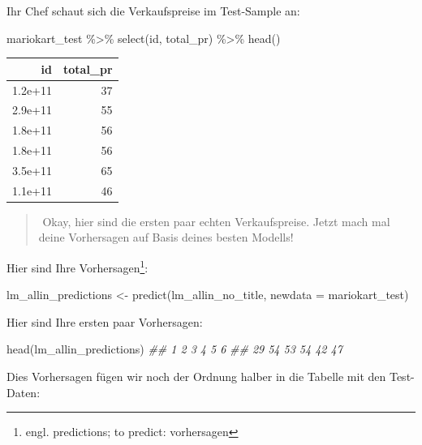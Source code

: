 \documentclass[
  letterpaper,
]{scrbook}
\newenvironment{Shaded}{\begin{snugshade}}{\end{snugshade}}
\newcommand{\AttributeTok}[1]{\textcolor[rgb]{0.40,0.45,0.13}{#1}}
\newcommand{\DocumentationTok}[1]{\textcolor[rgb]{0.37,0.37,0.37}{\textit{#1}}}
\newcommand{\FunctionTok}[1]{\textcolor[rgb]{0.28,0.35,0.67}{#1}}
\newcommand{\NormalTok}[1]{\textcolor[rgb]{0.00,0.23,0.31}{#1}}
\newcommand{\OtherTok}[1]{\textcolor[rgb]{0.00,0.23,0.31}{#1}}
\newcommand{\SpecialCharTok}[1]{\textcolor[rgb]{0.37,0.37,0.37}{#1}}
\theoremstyle{definition}
\theoremstyle{definition}
\theoremstyle{definition}
\theoremstyle{remark}
\begin{document}
Ihr Chef schaut sich die Verkaufspreise im Test-Sample an:

\begin{Shaded}
\begin{Highlighting}[]
\NormalTok{mariokart\_test }\SpecialCharTok{\%\textgreater{}\%} 
  \FunctionTok{select}\NormalTok{(id, total\_pr) }\SpecialCharTok{\%\textgreater{}\%} 
  \FunctionTok{head}\NormalTok{()}
\end{Highlighting}
\end{Shaded}

\begin{longtable}[]{@{}rr@{}}
\toprule\noalign{}
id & total\_pr \\
\midrule\noalign{}
\endhead
\bottomrule\noalign{}
\endlastfoot
1.2e+11 & 37 \\
2.9e+11 & 55 \\
1.8e+11 & 56 \\
1.8e+11 & 56 \\
3.5e+11 & 65 \\
1.1e+11 & 46 \\
\end{longtable}

\begin{quote}
{}️ Okay, hier sind die ersten paar echten Verkaufspreise.
Jetzt mach mal deine Vorhersagen auf Basis deines besten Modells!
\end{quote}

Hier sind Ihre Vorhersagen\footnote{engl. predictions; to predict:
  vorhersagen}:

\begin{Shaded}
\begin{Highlighting}[]
\NormalTok{lm\_allin\_predictions }\OtherTok{\textless{}{-}} \FunctionTok{predict}\NormalTok{(lm\_allin\_no\_title, }\AttributeTok{newdata =}\NormalTok{ mariokart\_test)}
\end{Highlighting}
\end{Shaded}

Hier sind Ihre ersten paar Vorhersagen:

\begin{Shaded}
\begin{Highlighting}[]
\FunctionTok{head}\NormalTok{(lm\_allin\_predictions)}
\DocumentationTok{\#\#  1  2  3  4  5  6 }
\DocumentationTok{\#\# 29 54 53 54 42 47}
\end{Highlighting}
\end{Shaded}

Dies Vorhersagen fügen wir noch der Ordnung halber in die Tabelle mit
den Test-Daten:
\end{document}

